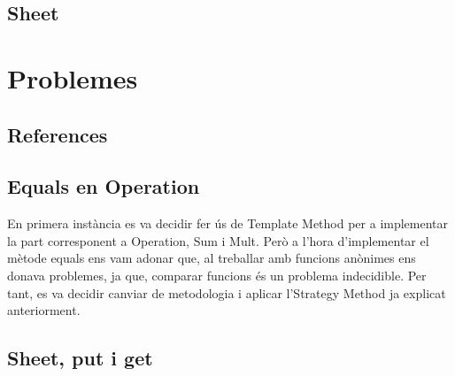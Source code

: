 \documentclass{article}
\begin{document}
	\subsection{Sheet}%
	\section{Problemes}
	\subsection{References}%
	\subsection{Equals en Operation}%
En primera instància es va decidir fer ús de Template Method per a implementar la part corresponent a Operation, Sum i Mult. Però a l'hora d'implementar el mètode equals ens vam adonar que, al treballar amb funcions anònimes ens donava problemes, ja que, comparar funcions és un problema indecidible. Per tant, es va decidir canviar de metodologia i aplicar l'Strategy Method ja explicat anteriorment.
	\subsection{Sheet, put i get}%
\end{document}
